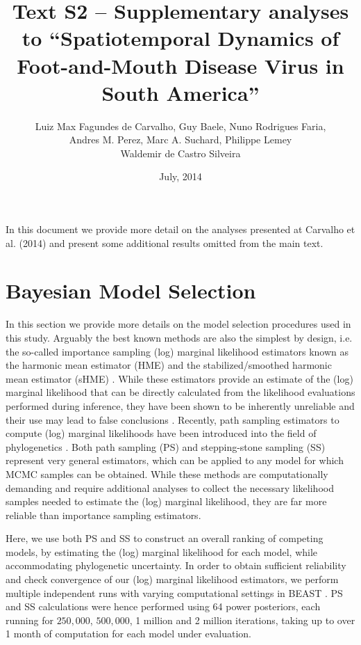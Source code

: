 \documentclass[a4paper,10pt]{article}
\title{Text S2 -- Supplementary analyses to ``Spatiotemporal Dynamics of Foot-and-Mouth Disease Virus in South America''} %
\author{
Luiz Max Fagundes de Carvalho, Guy Baele, Nuno Rodrigues Faria,\\
Andres M. Perez, Marc A. Suchard,  Philippe Lemey\\
Waldemir de Castro Silveira
}
\date{July, 2014}
\begin{document}
\maketitle

In this document we provide more detail on the analyses presented at Carvalho et al. (2014) and present some additional results omitted from the main text.

\section{Bayesian Model Selection}

In this section we provide more details on the model selection procedures used in this study.
Arguably the best known methods are also the simplest by design, i.e. the so-called importance sampling (log) marginal likelihood estimators known as the harmonic mean estimator (HME) \cite{Newton} and the stabilized/smoothed harmonic mean estimator (sHME) \cite{M-suchard2005models}.
While these estimators provide an estimate of the (log) marginal likelihood that can be directly calculated from the likelihood evaluations performed during inference, they have been shown to be inherently unreliable and their use may lead to false conclusions \cite{M-LartillotPhilippe, M-Xie, M-Baele2012, M-Baele2013a,M-Baele2013b}.
Recently, path sampling estimators to compute (log) marginal likelihoods have been introduced into the field of phylogenetics \cite{M-LartillotPhilippe, M-Xie}.
Both path sampling (PS) and stepping-stone sampling (SS) represent very general estimators, which can be applied to any model for which MCMC samples can be obtained.
While these methods are computationally demanding and require additional analyses to collect the necessary likelihood samples needed to estimate the (log) marginal likelihood, they are far more reliable than importance sampling estimators.

Here, we use both PS and SS to construct an overall ranking of competing models, by estimating the (log) marginal likelihood for each model, while accommodating phylogenetic uncertainty.
In order to obtain sufficient reliability and check convergence of our (log) marginal likelihood estimators, we perform multiple independent runs with varying computational settings in BEAST \cite{M-beast2012}.
PS and SS calculations were hence performed using 64 power posteriors, each running for $250,000$, $500,000$, 1 million and 2 million iterations, taking up to over 1 month of computation for each model under evaluation.
\end{document}

